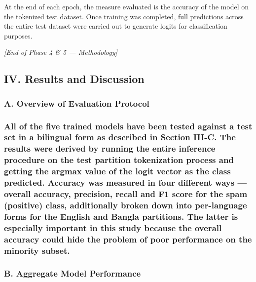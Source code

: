 At the end of each epoch, the measure evaluated is the accuracy of the
model on the tokenized test dataset. Once training was completed, full
predictions across the entire test dataset were carried out to generate
logits for classification purposes.

\emph{{[}End of Phase 4 \& 5 --- Methodology{]}}

\subsection{IV. Results and
Discussion}\label{iv.-results-and-discussion}

\subsubsection{A. Overview of Evaluation
Protocol}\label{a.-overview-of-evaluation-protocol}

\subsubsection{All of the five trained models have been tested against a
test set in a bilingual form as described in Section III-C. The results
were derived by running the entire inference procedure on the test
partition tokenization process and getting the argmax value of the logit
vector as the class predicted. Accuracy was measured in four different
ways --- overall accuracy, precision, recall and F1 score for the spam
(positive) class, additionally broken down into per-language forms for
the English and Bangla partitions. The latter is especially important in
this study because the overall accuracy could hide the problem of poor
performance on the minority
subset.}\label{all-of-the-five-trained-models-have-been-tested-against-a-test-set-in-a-bilingual-form-as-described-in-section-iii-c.-the-results-were-derived-by-running-the-entire-inference-procedure-on-the-test-partition-tokenization-process-and-getting-the-argmax-value-of-the-logit-vector-as-the-class-predicted.-accuracy-was-measured-in-four-different-ways-overall-accuracy-precision-recall-and-f1-score-for-the-spam-positive-class-additionally-broken-down-into-per-language-forms-for-the-english-and-bangla-partitions.-the-latter-is-especially-important-in-this-study-because-the-overall-accuracy-could-hide-the-problem-of-poor-performance-on-the-minority-subset.}

\subsubsection{B. Aggregate Model
Performance}\label{b.-aggregate-model-performance}

